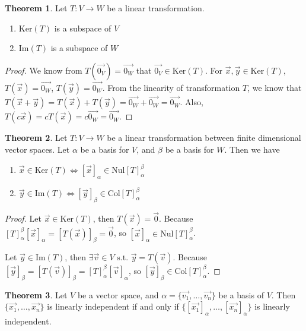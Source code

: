 \documentclass{article}
\theoremstyle{definition}
\newtheorem{theorem}{Theorem}[section]
\theoremstyle{remark}
\begin{document}
\begin{theorem}
    Let $T:V\rightarrow W$ be a linear transformation. 
    \begin{enumerate}
        \item $\text{Ker}(T)$ is a subspace of $V$
        \item $\text{Im}(T)$ is a subspace of $W$
    \end{enumerate}
\end{theorem}

\begin{proof}
    We know from $T(\vec{0_V})=\vec{0_W}$ that $\vec{0_V}\in\text{Ker}(T)$.
    For $\vec{x},\vec{y}\in\text{Ker}(T)$, $T(\vec{x})=\vec{0_W}$, $T(\vec{y})=\vec{0_W}$.
    From the linearity of transformation $T$, we know that $T(\vec{x}+\vec{y})=T(\vec{x})+T(\vec{y})=\vec{0_W}+\vec{0_W}=\vec{0_W}$.
    Also, $T(c\vec{x})=cT(\vec{x})=c\vec{0_W}=\vec{0_W}$.
\end{proof}

\begin{theorem}
    Let $T:V\rightarrow W$ be a linear transformation between finite dimensional vector spaces.
    Let $\alpha$ be a basis for $V$, and $\beta$ be a basis for $W$. 
    Then we have
    \begin{enumerate}
        \item $\vec{x}\in\text{Ker}(T) \iff [\vec{x}]_{\alpha}\in\text{Nul}[T]_{\alpha}^{\beta}$
        \item $\vec{y}\in\text{Im}(T) \iff [\vec{y}]_{\beta}\in\text{Col}[T]_{\alpha}^{\beta}$
    \end{enumerate}
\end{theorem}

\begin{proof}
    Let $\vec{x}\in\text{Ker}(T)$, then $T(\vec{x})=\vec{0}$.
    Because $[T]_{\alpha}^{\beta}[\vec{x}]_{\alpha}=[T(\vec{x})]_{\beta}=\vec{0}$, so $[\vec{x}]_{\alpha}\in\text{Nul}[T]_{\alpha}^{\beta}$.

    Let $\vec{y}\in\text{Im}(T)$, then $\exists \vec{v}\in V \text{ s.t. }\vec{y}=T(\vec{v})$.
    Because $[\vec{y}]_{\beta}=[T(\vec{v})]_{\beta}=[T]_{\alpha}^{\beta}[\vec{v}]_{\alpha}$, so $[\vec{y}]_{\beta}\in\text{Col}[T]_{\alpha}^{\beta}$.
\end{proof}

\begin{theorem}
    Let $V$ be a vector space, and $\alpha=\{\vec{v_1},\dots, \vec{v_n}\}$ be a basis of $V$.
    Then $\{\vec{x_1},\dots, \vec{x_n}\}$ is linearly independent if and only if $\{[\vec{x_1}]_{\alpha},\dots, [\vec{x_n}]_{\alpha}\}$ is linearly independent.
\end{theorem}
\end{document}
